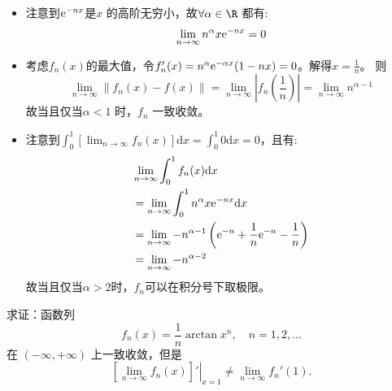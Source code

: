 \begin{solution}
    \begin{itemize}
        \item 注意到\(\mathrm{e}^{-nx}\)是\(x\) 的高阶无穷小，故\(\forall \alpha
            \in \R\) 都有: \[
                \lim_{n \to \infty} n^{\alpha} x \mathrm{e}^{-n x} = 0
            \]
        \item 考虑\(f_{n}(x)\)的最大值，令\(f_{n}'(x) = n^{\alpha}
            \mathrm{e}^{-\alpha x} (1 - n x) = 0\)。解得\(x =
            \frac{1}{n}\)。
            则\[
                \lim_{n \to \infty} \left\lVert f_{n}(x) - f(x)
                \right\rVert = \lim_{n \to \infty} \left|
                f_{n}\left(\frac{1}{n}\right) \right| = \lim_{n \to
                \infty} n^{\alpha - 1}
            \]
            故当且仅当\(\alpha <  1\) 时，\(f_{n}\) 一致收敛。
        \item 注意到\(\int_0^1 \left[ \lim_{n \to \infty} f_n(x) \right]
            \mathrm{d}x = \int_0^1 0 \mathrm{d}x = 0\)，且有:
            \begin{align*}
                & \lim_{n \to \infty} \int_0^1 f_n(x) \mathrm{d}x \\
                & = \lim_{n \to \infty} \int_{0}^{1} n^{\alpha} x
                \mathrm{e}^{-nx} \mathrm{d}x                       \\
                & = \lim_{n \to \infty} -n^{\alpha - 1} \left(
                    \mathrm{e}^{-n} + \frac{1}{n}\mathrm{e}^{-n}
                -\frac{1}{n} \right)                               \\
                & = \lim_{n \to \infty} -n^{\alpha - 2}
            \end{align*}
            故当且仅当\(\alpha > 2\)时，\(f_{n}\)可以在积分号下取极限。
    \end{itemize}
\end{solution}

\begin{problem}
    求证：函数列
    \[
        f_n(x) = \frac{1}{n} \arctan x^n, \quad n = 1, 2, \dots
    \]
    在 \((-\infty, +\infty)\) 上一致收敛，但是
    \[
        \left. \left[ \lim_{n \to \infty} f_n(x) \right]'
        \right|_{x = 1}
        \neq \lim_{n \to \infty} f_n'(1).
    \]
\end{problem}

